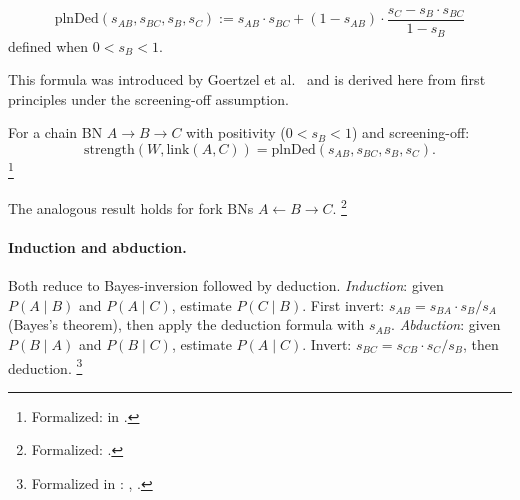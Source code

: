 \documentclass[11pt,openany]{report}
\begin{document}
\begin{definition}
\label{def:deduction-strength}
\[
  \mathrm{plnDed}(s_{AB}, s_{BC}, s_B, s_C) :=
  s_{AB} \cdot s_{BC}
  + (1 - s_{AB}) \cdot \frac{s_C - s_B \cdot s_{BC}}{1 - s_B}
\]
defined when $0 < s_B < 1$.
\end{definition}

\noindent
This formula was introduced by Goertzel et
al.~\cite{goertzel2009pln} and is derived here from first principles
under the screening-off assumption.

\begin{theorem}
\label{thm:chain-deduction}
For a chain BN $A \to B \to C$ with positivity ($0 < s_B < 1$) and
screening-off:
\[
  \mathrm{strength}(W, \mathrm{link}(A, C)) =
  \mathrm{plnDed}(s_{AB}, s_{BC}, s_B, s_C).
\]%
\footnote{Formalized: 
in .}
\end{theorem}

\noindent
The analogous result holds for fork BNs
$A \leftarrow B \to C$.%
\footnote{Formalized:
.}

\paragraph{Induction and abduction.}
Both reduce to Bayes-inversion followed by deduction.
\emph{Induction}: given $P(A \mid B)$ and $P(A \mid C)$, estimate
$P(C \mid B)$.  First invert:
$s_{AB} = s_{BA} \cdot s_B / s_A$ (Bayes's theorem), then apply
the deduction formula with $s_{AB}$.
\emph{Abduction}: given $P(B \mid A)$ and $P(B \mid C)$, estimate
$P(A \mid C)$.  Invert:
$s_{BC} = s_{CB} \cdot s_C / s_B$, then deduction.%
\footnote{Formalized in
:
,
.}
\end{document}
